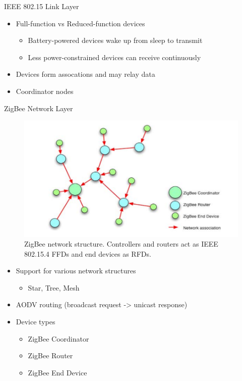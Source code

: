 \documentclass{beamer}
\begin{document}
\begin{frame}{IEEE 802.15 Link Layer}
  \begin{itemize}
    \item Full-function vs Reduced-function devices
	\begin{itemize}
  		\item Battery-powered devices wake up from sleep to transmit
  		\item Less power-constrained devices can receive continuously
	\end{itemize}
	
  	\item Devices form assocations and may relay data
  	\item Coordinator nodes
  \end{itemize}
\end{frame}

\begin{frame}{ZigBee Network Layer}
  \begin{figure}
  \includegraphics[width=\textwidth]{zbnetstructure.png}
  \caption{ZigBee network structure. Controllers and routers act as IEEE 802.15.4 FFDs and end devices as RFDs.}
  \end{figure}
  \begin{itemize}
  	\item Support for various network structures
  	\begin{itemize}
  		\item Star, Tree, Mesh
  	\end{itemize}
  	\item AODV routing (broadcast request -> unicast response)
  	\item Device types
  	\begin{itemize}
  		\item ZigBee Coordinator
  		\item ZigBee Router
  		\item ZigBee End Device
  	\end{itemize}
  \end{itemize}
\end{frame}
\end{document}
